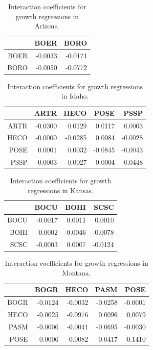 \documentclass[12pt,]{article}
\begin{document}
\begin{table}[ht]
\centering
\caption{Interaction coefficients for growth regressions in Arizona.} 
\begin{tabular}{rrr}
  \hline
 & BOER & BORO \\ 
  \hline
BOER & -0.0033 & -0.0171 \\ 
  BORO & -0.0050 & -0.0772 \\ 
   \hline
\end{tabular}
\end{table}\begin{table}[ht]
\centering
\caption{Interaction coefficients for growth regressions in Idaho.} 
\begin{tabular}{rrrrr}
  \hline
 & ARTR & HECO & POSE & PSSP \\ 
  \hline
ARTR & -0.0300 & 0.0129 & 0.0117 & 0.0003 \\ 
  HECO & -0.0000 & -0.0285 & 0.0084 & -0.0028 \\ 
  POSE & 0.0001 & 0.0032 & -0.0845 & -0.0043 \\ 
  PSSP & -0.0003 & -0.0027 & -0.0004 & -0.0448 \\ 
   \hline
\end{tabular}
\end{table}\begin{table}[ht]
\centering
\caption{Interaction coefficients for growth regressions in Kansas.} 
\begin{tabular}{rrrr}
  \hline
 & BOCU & BOHI & SCSC \\ 
  \hline
BOCU & -0.0017 & 0.0011 & 0.0010 \\ 
  BOHI & 0.0002 & -0.0046 & -0.0078 \\ 
  SCSC & -0.0003 & 0.0007 & -0.0124 \\ 
   \hline
\end{tabular}
\end{table}\begin{table}[ht]
\centering
\caption{Interaction coefficients for growth regressions in Montana.} 
\begin{tabular}{rrrrr}
  \hline
 & BOGR & HECO & PASM & POSE \\ 
  \hline
BOGR & -0.0124 & -0.0032 & -0.0258 & -0.0001 \\ 
  HECO & -0.0025 & -0.0976 & 0.0096 & 0.0079 \\ 
  PASM & -0.0006 & -0.0041 & -0.0695 & -0.0030 \\ 
  POSE & 0.0006 & -0.0082 & -0.0417 & -0.1410 \\ 
   \hline
\end{tabular}

\end{table}
\end{document}
